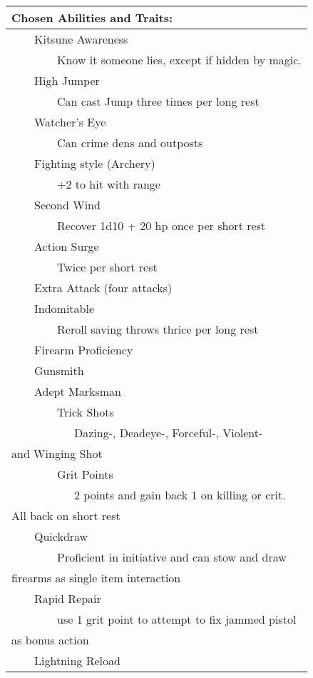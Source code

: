 \documentclass[11pt]{article}
\newcommand{\tabitem}{~~\llap{--}~~}
\newcommand{\tabtabitem}{~~~~~~\llap{$\bullet$}~~}
\newcommand{\tabtabtabitem}{~~~~~~~~~\llap{$\star$}~~}
\begin{document}
\begin{multicols}{2}
\vspace{4mm}

\noindent \begin{tabularx}{\linewidth}{@{}l}
{\Large \textbf{Chosen Abilities and Traits:}} \\
\hline
\tabitem Kitsune Awareness \\
\tabtabitem Know it someone lies, except if hidden by magic. \\
\tabitem High Jumper \\
\tabtabitem Can cast Jump three times per long rest \\
\tabitem Watcher's Eye \\
\tabtabitem Can crime dens and outposts \\
\tabitem Fighting style (Archery) \\
\tabtabitem +2 to hit with range \\
\tabitem Second Wind \\
\tabtabitem Recover 1d10 + 20 hp once per short rest \\
\tabitem Action Surge \\
\tabtabitem Twice per short rest \\
\tabitem Extra Attack (four attacks) \\
\tabitem Indomitable \\
\tabtabitem Reroll saving throws thrice per long rest \\
\tabitem Firearm Proficiency \\
\tabitem Gunsmith \\
\tabitem Adept Marksman \\
\tabtabitem Trick Shots \\
\tabtabtabitem Dazing-, Deadeye-, Forceful-, Violent- \\
and Winging Shot \\
\tabtabitem Grit Points \\
\tabtabtabitem 2 points and gain back 1 on killing or crit. \\
All back on short rest \\
\tabitem Quickdraw \\
\tabtabitem Proficient in initiative and can stow and draw \\
firearms as single item interaction \\
\tabitem Rapid Repair \\
\tabtabitem use 1 grit point to attempt to fix jammed pistol \\
as bonus action \\
\tabitem Lightning Reload \\

\end{tabularx}
\end{multicols}
\end{document}
